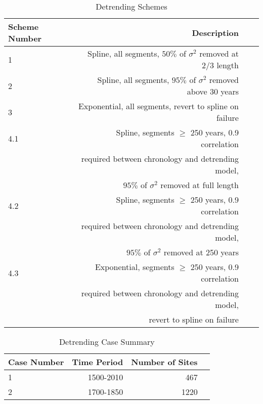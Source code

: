 \documentclass[phd,tocprelim]{cornell}
\begin{document}
\begin{table}[!tbp]
\centering
\begin{tabular}{lrrr}
\toprule
             Scheme Number &     Description \\
\midrule

1 & Spline, all segments, $50\%$ of $\sigma^2$ removed at $2/3$ length \\
2 & Spline, all segments, $95\%$ of $\sigma^2$ removed above 30 years \\
3 & Exponential, all segments, revert to spline on failure \\
4.1 & Spline, segments $\geq$ 250 years, 0.9 correlation \\
& required between chronology and detrending model, \\
& $95\%$ of $\sigma^2$ removed at full length  \\
4.2 & Spline, segments $\geq$ 250 years, 0.9 correlation \\
& required between chronology and detrending model, \\
& $95\%$ of $\sigma^2$ removed at 250 years  \\
4.3 & Exponential, segments $\geq$ 250 years, 0.9 correlation \\
& required between chronology and detrending model, \\
& revert to spline on failure \\

\bottomrule
\end{tabular}
\caption{Detrending Schemes}
\label{dt:schemes}
\end{table}

\begin{table}[!tbp]
\centering
\begin{tabular}{lrrr}
\toprule
             Case Number & Time Period & Number of Sites \\
\midrule

1 & 1500-2010 & 467 \\
2 & 1700-1850 & 1220 \\

\bottomrule
\end{tabular}
\caption{Detrending Case Summary}
\label{dt:cases}
\end{table}
\end{document}
